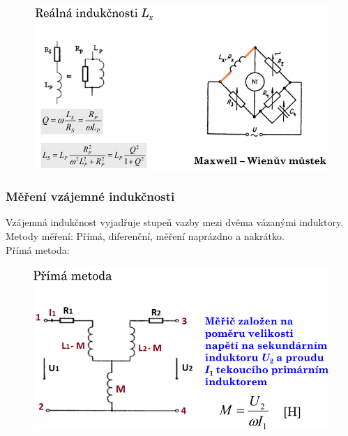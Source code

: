 \begin{figure}[h!]
    \centering
    \includegraphics[scale = 0.5]{images/MostMerL2.png}
\end{figure}

\subsubsection{Měření vzájemné indukčnosti}
Vzájemná indukčnost vyjadřuje stupeň vazby mezi dvěma vázanými induktory.\\
Metody měření: Přímá, diferenční, měření naprázdno a nakrátko.\\

Přímá metoda:\\
\begin{figure}[h!]
    \centering
    \includegraphics[scale = 0.5]{images/VzLPrima.png}
\end{figure}

